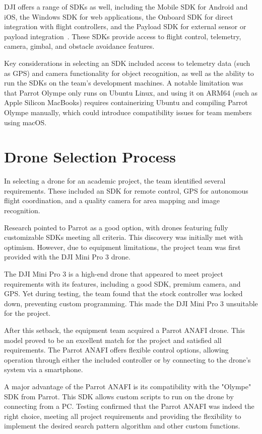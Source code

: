 DJI offers a range of SDKs as well, including the Mobile SDK for Android and iOS, the Windows SDK for web applications, the Onboard SDK for direct integration with flight controllers, and the Payload SDK for external sensor or payload integration~\cite{DJIDocumentation}. These SDKs provide access to flight control, telemetry, camera, gimbal, and obstacle avoidance features.

Key considerations in selecting an SDK included access to telemetry data (such as GPS) and camera functionality for object recognition, as well as the ability to run the SDKs on the team's development machines. A notable limitation was that Parrot Olympe only runs on Ubuntu Linux, and using it on ARM64 (such as Apple Silicon MacBooks) requires containerizing Ubuntu and compiling Parrot Olympe manually, which could introduce compatibility issues for team members using macOS.

\section{Drone Selection Process}
In selecting a drone for an academic project, the team identified several requirements. These included an SDK for remote control, GPS for autonomous flight coordination, and a quality camera for area mapping and image recognition.

Research pointed to Parrot as a good option, with drones featuring fully customizable SDKs meeting all criteria. This discovery was initially met with optimism. However, due to equipment limitations, the project team was first provided with the DJI Mini Pro 3 drone.

The DJI Mini Pro 3 is a high-end drone that appeared to meet project requirements with its features, including a good SDK, premium camera, and GPS. Yet during testing, the team found that the stock controller was locked down, preventing custom programming. This made the DJI Mini Pro 3 unsuitable for the project.

After this setback, the equipment team acquired a Parrot ANAFI drone. This model proved to be an excellent match for the project and satisfied all requirements. The Parrot ANAFI offers flexible control options, allowing operation through either the included controller or by connecting to the drone's system via a smartphone.

A major advantage of the Parrot ANAFI is its compatibility with the "Olympe" SDK from Parrot. This SDK allows custom scripts to run on the drone by connecting from a PC. Testing confirmed that the Parrot ANAFI was indeed the right choice, meeting all project requirements and providing the flexibility to implement the desired search pattern algorithm and other custom functions.

